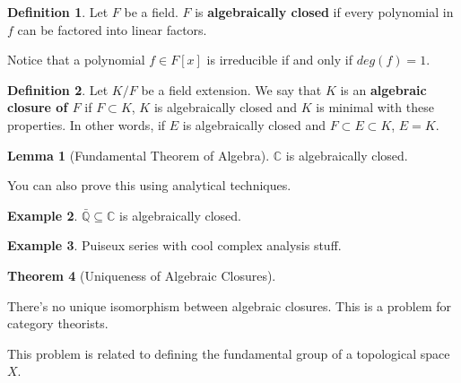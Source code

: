 \documentclass{article}
\theoremstyle{definition}
\newtheorem{definition}{Definition}
\newtheorem{theorem}{Theorem}[section]
\newtheorem{lemma}[theorem]{Lemma}
\newtheorem{example}[theorem]{Example}
\newcommand{\Q}{\mathbb{Q}}
\newcommand{\C}{\mathbb{C}}
\begin{document}
\begin{definition}
    Let $F$ be a field. $F$ is \textbf{algebraically closed} if every polynomial in $f$ can be factored
    into linear factors.
\end{definition}

Notice that a polynomial $f \in F[x]$ is irreducible if and only if $deg(f) = 1$.

\begin{definition}
    Let $K/F$ be a field extension. We say that $K$ is an \textbf{algebraic closure of $F$} if $F \subset K$, $K$ is algebraically
    closed and $K$ is minimal with these properties. In other words, if $E$ is algebraically closed and $F \subset E \subset K$,
    $E = K$. 
\end{definition}



\begin{lemma}[Fundamental Theorem of Algebra]
    $\C$ is algebraically closed.
\end{lemma}

You can also prove this using analytical techniques.

\begin{example}
    $\bar{\Q} \subseteq \C$ is algebraically closed.
\end{example}

\begin{example}
    Puiseux series with cool complex analysis stuff.    
\end{example}

\begin{theorem}[Uniqueness of Algebraic Closures]
    
\end{theorem}

There's no unique isomorphism between algebraic closures. This is a problem for category theorists.

This problem is related to defining the fundamental group of a topological space $X$.
\end{document}
